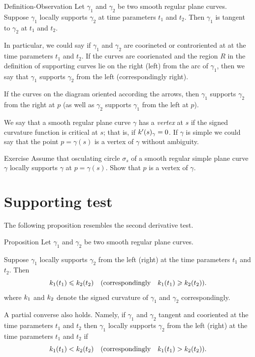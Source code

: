 \begin{thm}{Definition-Observation}
Let $\gamma_1$ and $\gamma_2$ be two smooth regular plane curves.
Suppose $\gamma_1$ locally supports $\gamma_2$ at time parameters $t_1$ and $t_2$.
Then $\gamma_1$ is tangent to $\gamma_2$ at $t_1$ and $t_2$.

In particular, we could say if $\gamma_1$ and $\gamma_2$ are coorineted or controriented at at the time parameters $t_1$ and $t_2$.
If the curves are coorienated and the region $R$ in the definition of supporting curves lie on the right (left) from the arc of $\gamma_1$, then we say that 
$\gamma_1$ supports $\gamma_2$ from the left (correspondingly right).
\end{thm}

If the curves on the diagram oriented according the arrows, then $\gamma_1$ supports $\gamma_2$ from the right at $p$ (as well as $\gamma_2$ supports $\gamma_1$ from the left at $p$).

We say that a smooth regular plane curve $\gamma$ has a \emph{vertex} at $s$
if the signed curvature function is critical at $s$;
that is, if $k'(s)_\gamma=0$.
If $\gamma$ is simple we could say that the point $p=\gamma(s)$ is a vertex of $\gamma$ without ambiguity.

\begin{thm}{Exercise}\label{ex:vertex-support}
Assume that osculating circle $\sigma_s$ of a smooth regular simple plane curve $\gamma$ locally supports $\gamma$ at $p=\gamma(s)$.
Show that $p$ is a vertex of $\gamma$.
\end{thm}

\section*{Supporting test}

The following proposition resembles the second derivative test. 

\begin{thm}{Proposition}\label{prop:supporting-circline}
Let $\gamma_1$ and $\gamma_2$ be two smooth regular plane curves.

Suppose $\gamma_1$ locally supports $\gamma_2$ from the left (right) at the time parameters $t_1$ and $t_2$.
Then 
\[k_1(t_1)\leqslant k_2(t_2)\quad(\text{correspondingly}\quad k_1(t_1)\geqslant k_2(t_2)).\]
where $k_1$ and $k_2$ denote the signed curvature of $\gamma_1$ and $\gamma_2$ correspondingly.

A partial converse also holds.
Namely, if $\gamma_1$ and $\gamma_2$ tangent and cooriented at the time parameters $t_1$ and $t_2$
then $\gamma_1$ locally supports $\gamma_2$ from the left (right) at the time parameters $t_1$ and $t_2$
if 
\[k_1(t_1)< k_2(t_2)\quad(\text{correspondingly}\quad k_1(t_1)> k_2(t_2)).\]

\end{thm}

